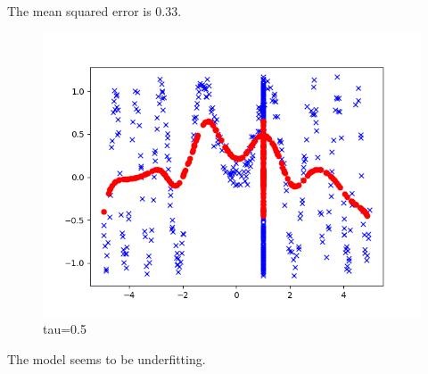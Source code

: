 \begin{answer}
The mean squared error is 0.33.\\
\begin{figure}[htbp]
    \centering
    \includegraphics[width=0.5\linewidth]{tex/tau_0.5.png}
    \caption{tau=0.5}
\end{figure}
The model seems to be underfitting.
\end{answer}
